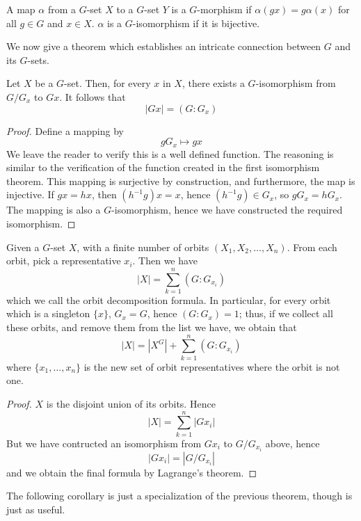 A map $\alpha$ from a  $G$-set $X$ to a $G$-set $Y$ is a $G$-morphism  if $\alpha(gx) = g\alpha(x)$ for all $g \in G$ and $x \in X$. $\alpha$ is a $G$-isomorphism if it is bijective.

We now give a theorem which establishes an intricate connection between $G$ and its $G$-sets.

\begin{theorem} 
    Let $X$ be a $G$-set. Then, for every $x$ in $X$, there exists a $G$-isomorphism from $G/G_x$ to $Gx$. It follows that
    \[ |Gx| = (G:G_x) \]
\end{theorem}
\begin{proof}
    Define a mapping by
    \[ gG_x \mapsto gx \]
    We leave the reader to verify this is a well defined function. The reasoning is similar to the verification of the function created in the first isomorphism theorem. This mapping is surjective by construction, and furthermore, the map is injective. If $gx = hx$, then $(h^{-1}g)x = x$, hence $(h^{-1}g) \in G_x$, so $gG_x = hG_x$. The mapping is also a $G$-isomorphism, hence we have constructed the required isomorphism.
\end{proof}

\begin{corollary} 
    Given a $G$-set $X$, with a finite number of orbits $(X_1, X_2, \dots, X_n)$. From each orbit, pick a representative $x_i$. Then we have
    \[ |X| = \sum_{k=1}^n (G:G_{x_i}) \]
    which we call the orbit decomposition formula. In particular, for every orbit which is a singleton $\{ x \}$, $G_x = G$, hence $(G:G_x) = 1$; thus, if we collect all these orbits, and remove them from the list we have, we obtain that
    \[ |X| = |X^G| + \sum_{k=1}^{n} (G:G_{x_i}) \]
    where $\{ x_1, \dots, x_n \}$ is the new set of orbit representatives where the orbit is not one.
\end{corollary}
\begin{proof}
    $X$ is the disjoint union of its orbits. Hence
    \[ |X| = \sum_{k=1}^n |Gx_i| \]
    But we have contructed an isomorphism from $Gx_i$ to $G/G_{x_i}$ above, hence
    \[ |Gx_i| = |G/G_{x_i}| \]
    and we obtain the final formula by Lagrange's theorem.
\end{proof}

The following corollary is just a specialization of the previous theorem, though is just as useful.

